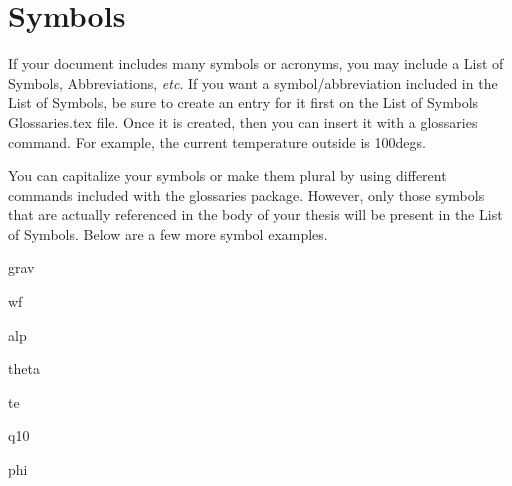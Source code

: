 \section{Symbols}

If your document includes many symbols or acronyms, you may include a List of Symbols, Abbreviations, \textit{etc}. If you want a symbol/abbreviation included in the List of Symbols, be sure to create an entry for it first on the List of Symbols Glossaries.tex file. Once it is created, then you can insert it with a glossaries command. For example, the current temperature outside is 100\glspl{deg}.

You can capitalize your symbols or make them plural by using different commands included with the glossaries package. However, only those symbols that are actually referenced in the body of your thesis will be present in the List of Symbols. Below are a few more symbol examples.

\gls{grav}

\gls{wf}

\gls{alp}

\gls{theta}

\gls{te}

\gls{q10}

\gls{phi}

